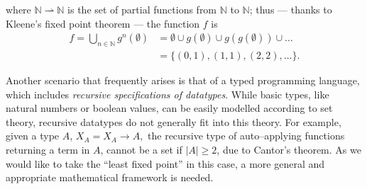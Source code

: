 where \(\mathbb{N} \rightharpoonup \mathbb{N}\) is the set of partial functions from \(\mathbb{N}\) to \(\mathbb{N}\); thus --- thanks to Kleene's fixed point theorem --- the function \(f\) is
\begin{align*}
  f = \bigcup_{n\in\mathbb{N}}g^n(\emptyset) &= \emptyset \cup g(\emptyset) \cup g(g(\emptyset)) \cup \dotsc \\
  &= \lbrace (0,1), (1,1), (2,2), \dotsc \rbrace.
\end{align*}

Another scenario that frequently arises is that of a typed programming language, which includes \emph{recursive specifications of datatypes}.
While basic types, like natural numbers or boolean values, can be easily modelled according to set theory, recursive datatypes do not generally fit into this theory.
For example, given a type \(A\),
\(X_A = X_A \to A,\)
the recursive type of auto--applying functions returning a term in \(A\), cannot be a set if \(\lvert A \rvert \ge 2\), due to Cantor's theorem.
As we would like to take the ``least fixed point'' in this case, a more general and appropriate mathematical framework is needed.

